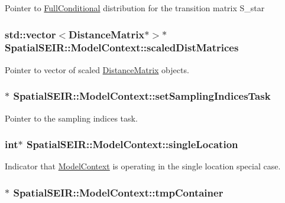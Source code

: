 Pointer to \hyperlink{classSpatialSEIR_1_1FullConditional}{Full\-Conditional} distribution for the transition matrix S\-\_\-star \hypertarget{classSpatialSEIR_1_1ModelContext_a7e263c5ae20ecdc892053a2588903459}{
\subsubsection[{scaled\-Dist\-Matrices}]{\setlength{\rightskip}{0pt plus 5cm}std\-::vector$<${\bf Distance\-Matrix}$\ast$$>$$\ast$ Spatial\-S\-E\-I\-R\-::\-Model\-Context\-::scaled\-Dist\-Matrices}}\label{classSpatialSEIR_1_1ModelContext_a7e263c5ae20ecdc892053a2588903459}
Pointer to vector of scaled \hyperlink{classSpatialSEIR_1_1DistanceMatrix}{Distance\-Matrix} objects. \hypertarget{classSpatialSEIR_1_1ModelContext_abc04b849ec0d819b9a4893862348a606}{
\subsubsection[{set\-Sampling\-Indices\-Task}]{$\ast$ Spatial\-S\-E\-I\-R\-::\-Model\-Context\-::set\-Sampling\-Indices\-Task}}\label{classSpatialSEIR_1_1ModelContext_abc04b849ec0d819b9a4893862348a606}
Pointer to the sampling indices task. \hypertarget{classSpatialSEIR_1_1ModelContext_a1bf4c4a975e9e060ef30b8c7be14b563}{
\subsubsection[{single\-Location}]{\setlength{\rightskip}{0pt plus 5cm}int$\ast$ Spatial\-S\-E\-I\-R\-::\-Model\-Context\-::single\-Location}}\label{classSpatialSEIR_1_1ModelContext_a1bf4c4a975e9e060ef30b8c7be14b563}
Indicator that \hyperlink{classSpatialSEIR_1_1ModelContext}{Model\-Context} is operating in the single location special case. \hypertarget{classSpatialSEIR_1_1ModelContext_ae4569072f48495d446ef85968cb9a42d}{
\subsubsection[{tmp\-Container}]{$\ast$ Spatial\-S\-E\-I\-R\-::\-Model\-Context\-::tmp\-Container}}\label{classSpatialSEIR_1_1ModelContext_ae4569072f48495d446ef85968cb9a42d}
